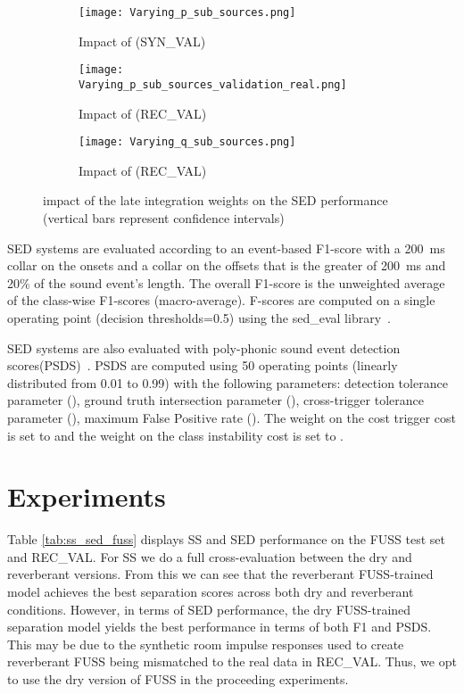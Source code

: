 \documentclass{article}
\begin{document}
\begin{sloppy}
\begin{figure*}
\centering
\begin{subfigure}{0.32\textwidth}
    \centering
    \texttt{[image: Varying\_p\_sub\_sources.png]}
    \caption{Impact of  (SYN\_VAL)}
    \label{fig:p_synth}
\end{subfigure}
\begin{subfigure}{0.32\textwidth}
    \centering
    \texttt{[image: Varying\_p\_sub\_sources\_validation\_real.png]}
    \caption{Impact of  (REC\_VAL)}
    \label{fig:p_record}
\end{subfigure}
\begin{subfigure}{0.32\textwidth}
    \centering
    \texttt{[image: Varying\_q\_sub\_sources.png]}
    \caption{Impact of  (REC\_VAL)}
    \label{fig:q_record}
\end{subfigure}
\caption{impact of the late integration weights on the SED performance (vertical bars represent confidence intervals)}
\label{fig:p_q_sed}
\end{figure*}

SED systems are evaluated according to an event-based F1-score with a 200~ms collar on the onsets and a collar on the offsets that is the greater of 200~ms and 20\% of the sound event's length. The overall F1-score is the unweighted average of the class-wise F1-scores (macro-average). F-scores are computed on a single operating point (decision thresholds=0.5) using the sed\_eval library~\cite{mesaros_metrics_2016}.


SED systems are also evaluated with poly-phonic sound event detection scores(PSDS)~\cite{Bilen2020}. PSDS are computed using 50 operating points (linearly distributed from 0.01 to 0.99) with the following parameters: detection tolerance parameter (), ground truth intersection parameter (), cross-trigger tolerance parameter (), maximum False Positive rate (). The weight on the cost trigger cost is set to  and the weight on the class instability cost is set to .



\section{Experiments}

Table \ref{tab:ss_sed_fuss} displays SS and SED performance on the FUSS test set and REC\_VAL. For SS we do a full cross-evaluation between the dry and reverberant versions. From this we can see that the reverberant FUSS-trained model achieves the best separation scores across both dry and reverberant conditions. However, in terms of SED performance, the dry FUSS-trained separation model yields the best performance in terms of both F1 and PSDS. This may be due to the synthetic room impulse responses used to create reverberant FUSS being mismatched to the real data in REC\_VAL. Thus, we opt to use the dry version of FUSS in the proceeding experiments.






\end{sloppy}
\end{document}
